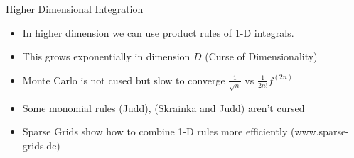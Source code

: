 \documentclass[xcolor=pdftex,dvipsnames,table,mathserif]{beamer}
\begin{document}
\begin{frame}{Higher Dimensional Integration}
\begin{itemize}
\item In higher dimension we can use product rules of 1-D integrals.
\item This grows exponentially in dimension $D$ (Curse of Dimensionality)
\item Monte Carlo is not cused but slow to converge $\frac{1}{\sqrt{n}}$ vs $\frac{1}{2n!} f^{(2n)}$
\item Some monomial rules (Judd), (Skrainka and Judd) aren't cursed
\item Sparse Grids show how to combine 1-D rules more efficiently (www.sparse-grids.de)
\end{itemize}
\end{frame}
\end{document}
